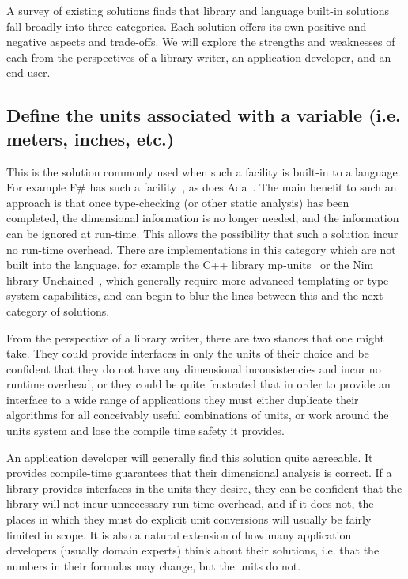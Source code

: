 \documentclass{article}
\begin{document}
A survey of existing solutions finds that library and language built-in solutions fall broadly into three categories.
Each solution offers its own positive and negative aspects and trade-offs.
We will explore the strengths and weaknesses of each from the perspectives of a library writer, an application developer, and an end user.

\subsection{Define the units associated with a variable (i.e. meters, inches, etc.)}
\label{static-units}

This is the solution commonly used when such a facility is built-in to a language.
For example F\# has such a facility~\cite{FSharpUnitsofMeasure2020}, as does Ada~\cite{DimensionalityCheckingAda}.
The main benefit to such an approach is that once type-checking (or other static analysis) has been completed,
the dimensional information is no longer needed, and the information can be ignored at run-time.
This allows the possibility that such a solution incur no run-time overhead.
There are implementations in this category which are not built into the language,
for example the C++ library mp-units~\cite{mpunits} or the Nim library Unchained~\cite{SciNimUnchained},
which generally require more advanced templating or type system capabilities,
and can begin to blur the lines between this and the next category of solutions.

From the perspective of a library writer, there are two stances that one might take.
They could provide interfaces in only the units of their choice and be confident that they do not have any dimensional inconsistencies and incur no runtime overhead,
or they could be quite frustrated that in order to provide an interface to a wide range of applications they must either duplicate their algorithms for all conceivably useful combinations of units, or work around the units system and lose the compile time safety it provides.

An application developer will generally find this solution quite agreeable.
It provides compile-time guarantees that their dimensional analysis is correct.
If a library provides interfaces in the units they desire, they can be confident that the library will not incur unnecessary run-time overhead,
and if it does not, the places in which they must do explicit unit conversions will usually be fairly limited in scope.
It is also a natural extension of how many application developers (usually domain experts) think about their solutions,
i.e. that the numbers in their formulas may change, but the units do not.
\end{document}
